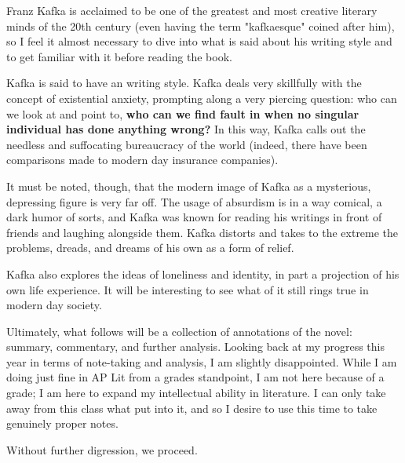 Franz Kafka is acclaimed to be one of the greatest and most creative literary
minds of the 20th century (even having the term "kafkaesque" coined after him),
so I feel it almost necessary to dive into what is said about his writing style
and to get familiar with it before reading the book.

Kafka is said to have an  writing style.
Kafka deals very skillfully with the concept of existential anxiety, prompting
along a very piercing question: who can we look at and point to, \textbf{who
can we find fault in when no singular individual has done anything wrong?} In
this way, Kafka calls out the needless and suffocating bureaucracy of the world
(indeed, there have been comparisons made to modern day insurance companies).

It must be noted, though, that the modern image of Kafka as a mysterious,
depressing figure is very far off. The usage of absurdism is in a way comical,
a dark humor of sorts, and Kafka was known for reading his writings in front of
friends and laughing alongside them. Kafka distorts and takes to the extreme
the problems, dreads, and dreams of his own as a form of relief.

Kafka also explores the ideas of loneliness and identity, in part a projection of his own life experience. It will be interesting to see what of it still rings true in modern day society.

Ultimately, what follows will be a collection of annotations of the novel:
summary, commentary, and further analysis. Looking back at my progress this
year in terms of note-taking and analysis, I am slightly disappointed. While I
am doing just fine in AP Lit from a grades standpoint, I am not here because of
a grade; I am here to expand my intellectual ability in literature. I can only
take away from this class what put into it, and so I desire to use this time to
take genuinely proper notes.

Without further digression, we proceed.
